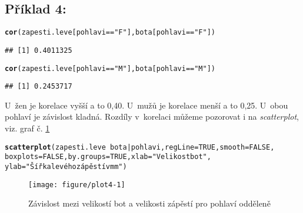 \documentclass[twoside]{article}\usepackage[]{graphicx}\usepackage[]{color}
\makeatletter
\def\maxwidth{ %
  \ifdim\Gin@nat@width>\linewidth
    \linewidth
  \else
    \Gin@nat@width
  \fi
}
\newcommand{\hlnum}[1]{\textcolor[rgb]{0.686,0.059,0.569}{#1}}%
\newcommand{\hlstr}[1]{\textcolor[rgb]{0.192,0.494,0.8}{#1}}%
\newcommand{\hlopt}[1]{\textcolor[rgb]{0,0,0}{#1}}%
\newcommand{\hlstd}[1]{\textcolor[rgb]{0.345,0.345,0.345}{#1}}%
\newcommand{\hlkwc}[1]{\textcolor[rgb]{0.333,0.667,0.333}{#1}}%
\newcommand{\hlkwd}[1]{\textcolor[rgb]{0.737,0.353,0.396}{\textbf{#1}}}%
\newenvironment{kframe}{%
 \def\at@end@of@kframe{}%
 \ifinner\ifhmode%
  \def\at@end@of@kframe{\end{minipage}}%
  \begin{minipage}{\columnwidth}%
 \fi\fi%
 \def\FrameCommand##1{\hskip\@totalleftmargin \hskip-\fboxsep
 \colorbox{shadecolor}{##1}\hskip-\fboxsep
     \hskip-\linewidth \hskip-\@totalleftmargin \hskip\columnwidth}%
 \MakeFramed {\advance\hsize-\width
   \@totalleftmargin\z@ \linewidth\hsize
   \@setminipage}}%
 {\par\unskip\endMakeFramed%
 \at@end@of@kframe}
\newenvironment{knitrout}{}{} %
\makeatother
\begin{document}
\subsection*{Příklad 4:}
\begin{knitrout}
\color{fgcolor}\begin{kframe}
\begin{alltt}
\hlkwd{cor}\hlstd{(zapesti.leve[pohlavi} \hlopt{==} \hlstr{"F"}\hlstd{], bota[pohlavi} \hlopt{==} \hlstr{"F"}\hlstd{])}
\end{alltt}
\begin{verbatim}
## [1] 0.4011325
\end{verbatim}
\begin{alltt}
\hlkwd{cor}\hlstd{(zapesti.leve[pohlavi} \hlopt{==} \hlstr{"M"}\hlstd{], bota[pohlavi} \hlopt{==} \hlstr{"M"}\hlstd{])}
\end{alltt}
\begin{verbatim}
## [1] 0.2453717
\end{verbatim}
\end{kframe}
\end{knitrout}
U~žen je korelace vyšší a to 0,40. U~mužů je korelace menší a to 0,25. U~obou pohlaví je závislost kladná. Rozdíly v~korelaci můžeme pozorovat i na \emph{scatterplot}, viz. graf č. \ref{fig:plot4}

\begin{knitrout}
\color{fgcolor}\begin{kframe}
\begin{alltt}
\hlkwd{scatterplot}\hlstd{(zapesti.leve}\hlopt{~}\hlstd{bota} \hlopt{|} \hlstd{pohlavi,} \hlkwc{regLine}\hlstd{=}\hlnum{TRUE}\hlstd{,} \hlkwc{smooth}\hlstd{=}\hlnum{FALSE}\hlstd{,}
    \hlkwc{boxplots}\hlstd{=}\hlnum{FALSE}\hlstd{,} \hlkwc{by.groups}\hlstd{=}\hlnum{TRUE}\hlstd{,} \hlkwc{xlab}\hlstd{=}\hlstr{"Velikost bot"}\hlstd{,}
    \hlkwc{ylab}\hlstd{=}\hlstr{"Šířka levého zápěstí v mm"}\hlstd{)}
\end{alltt}
\end{kframe}\begin{figure}[h]
\texttt{[image: figure/plot4-1]} \caption[Závislost mezi velikostí bot a velikosti zápěstí pro pohlaví odděleně]{Závislost mezi velikostí bot a velikosti zápěstí pro pohlaví odděleně}\label{fig:plot4}
\end{figure}


\end{knitrout}
\end{document}
